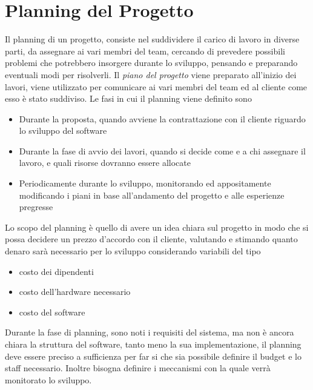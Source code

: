 \documentclass[10pt, letterpaper]{report}
\begin{document}
\chapter{Planning del Progetto}
Il planning di un progetto, consiste nel suddividere il carico di lavoro in diverse 
parti, da assegnare ai vari membri del team, cercando di prevedere possibili problemi 
che potrebbero insorgere durante lo sviluppo, pensando e preparando eventuali modi per 
risolverli.\acc 
Il \textit{piano del progetto} viene preparato all'inizio dei lavori, viene utilizzato per 
comunicare ai vari membri del team ed al cliente come esso è stato suddiviso. Le fasi in cui 
il planning viene definito sono \begin{itemize}
    \item Durante la proposta, quando avviene la contrattazione con il cliente riguardo lo sviluppo del 
    software 
    \item Durante la fase di avvio dei lavori, quando si decide come e a chi assegnare il lavoro, e 
    quali risorse dovranno essere allocate 
    \item Periodicamente durante lo sviluppo, monitorando ed appositamente modificando i piani in base 
    all'andamento del progetto e alle esperienze pregresse
\end{itemize}
Lo scopo del planning è quello di avere un idea chiara sul progetto in modo che si possa decidere 
un prezzo d'accordo con il cliente, valutando e stimando quanto denaro sarà necessario per 
lo sviluppo considerando variabili del tipo \begin{itemize}
    \item costo dei dipendenti 
    \item costo dell'hardware necessario 
    \item costo del software
\end{itemize}
Durante la fase di planning, sono noti i requisiti del sistema, ma non è ancora chiara la 
struttura del software, tanto meno la sua implementazione, il planning deve essere 
preciso a sufficienza per far si che sia possibile definire il budget e lo staff necessario. 
Inoltre bisogna definire i meccanismi con la quale verrà monitorato lo sviluppo.
\flowerLine
\end{document}

